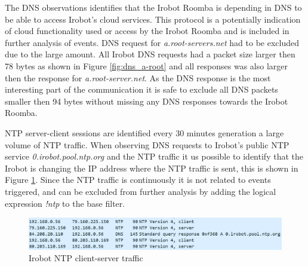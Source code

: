 The DNS observations identifies that the Irobot Roomba is depending in DNS to be able to access Irobot's cloud services. This protocol is a potentially indication of cloud functionality used or access by the Irobot Roomba and is included in further analysis of events. DNS request for \textit{a.root-servers.net} had to be excluded due to the large amount. All Irobot DNS requests had a packet size larger then 78 bytes as shown in Figure \ref{fig:dns_a-root} and all responses was also larger then the response for \textit{a.root-server.net}. As the DNS response is the most interesting part of the communication it is safe to exclude all DNS packets smaller then 94 bytes without missing any DNS responses towards the Irobot Roomba. 

NTP server-client sessions are identified every 30 minutes generation a large volume of NTP traffic. When observing DNS requests to Irobot's public NTP service \textit{0.irobot.pool.ntp.org} and the NTP traffic it us possible to identify that the Irobot is changing the IP address where the NTP traffic is sent, this is shown in Figure \ref{fig:irobot_ntp_dns}. Since the NTP traffic is continuously it is not related to events triggered, and can be excluded from further analysis by adding the logical expression \textit{!ntp} to the base filter.

\begin{figure}[H]
    \centering
    \includegraphics[width=\textwidth]{figures/NTP-irobot.png}
    \caption{Irobot NTP client-server traffic}
    \label{fig:irobot_ntp_dns}
\end{figure}
